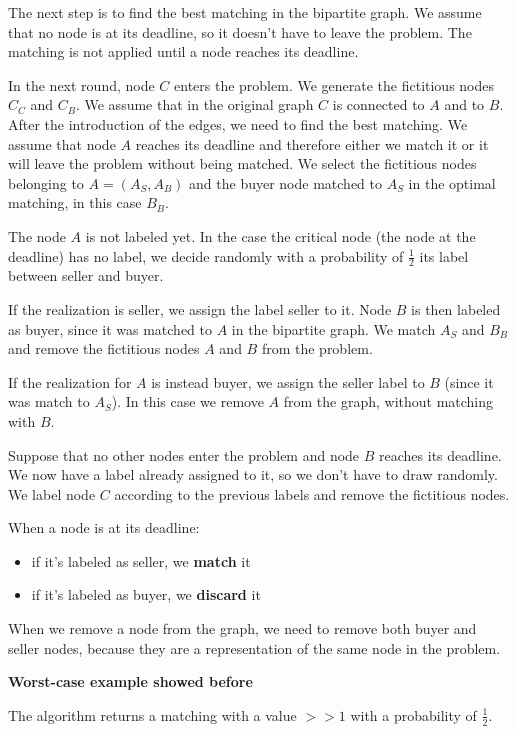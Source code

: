 \documentclass[10pt,a4paper]{article}
\begin{document}
The next step is to find the best matching in the bipartite graph. We assume that no node is at its deadline, so it doesn't have to leave the problem. The matching is not applied until a node reaches its deadline.

In the next round, node $C$ enters the problem. We generate the fictitious nodes $C_C$ and $C_B$. We assume that in the original graph $C$ is connected to $A$ and to $B$. After the introduction of the edges, we need to find the best matching. We assume that node $A$ reaches its deadline and therefore either we match it or it will leave the problem without being matched. We select the fictitious nodes belonging to $A =(A_S, A_B)$ and the buyer node matched to $A_S$ in the optimal matching, in this case $B_B$.

The node $A$ is not labeled yet. In the case the critical node (the node at the deadline) has no label, we decide randomly with a probability of $\frac{1}{2}$ its label between seller and buyer.

If the realization is seller, we assign the label seller to it. Node $B$ is then labeled as buyer, since it was matched to $A$ in the bipartite graph. We match $A_S$ and $B_B$ and remove the fictitious nodes $A$ and $B$ from the problem.

If the realization for $A$ is instead buyer, we assign the seller label to $B$ (since it was match to $A_S$). In this case we remove $A$ from the graph, without matching with $B$.

Suppose that no other nodes enter the problem and node $B$ reaches its deadline. We now have a label already assigned to it, so we don't have to draw randomly. We label node $C$ according to the previous labels and remove the fictitious nodes.

When a node is at its deadline:
\begin{itemize}
\item if it's labeled as seller, we \textbf{match} it
\item if it's labeled as buyer, we \textbf{discard} it
\end{itemize}

When we remove a node from the graph, we need to remove both buyer and seller nodes, because they are a representation of the same node in the problem.

\textbf{Worst-case example showed before}

The algorithm returns a matching with a value $>>1$ with a probability of $\frac{1}{2}$.
\end{document}
